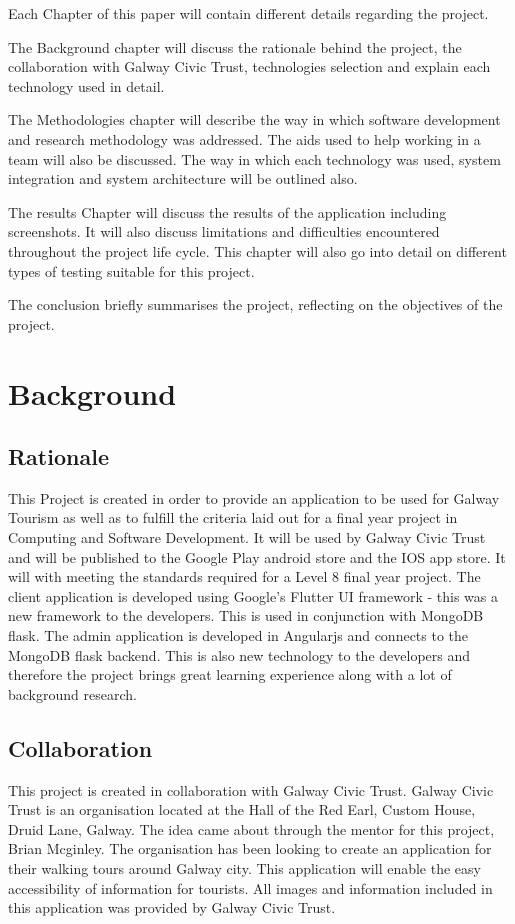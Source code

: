 Each Chapter of this paper will contain different details regarding the project. 

The Background chapter will discuss the rationale behind the project, the collaboration with Galway Civic Trust, technologies selection and explain each technology used in detail.

The Methodologies chapter will describe the way in which software development and research methodology was addressed. The aids used to help working in a team will also be discussed. The way in which each technology was used, system integration and system architecture will be outlined also.

The results Chapter will discuss the results of the application including screenshots. It will also discuss limitations and difficulties encountered throughout the project life cycle. This chapter will also go into detail on different types of testing suitable for this project.

The conclusion briefly summarises the project, reflecting on the objectives of the project.

\chapter{Background}
\section{Rationale}
This Project is created in order to provide an application to be used for Galway Tourism as well as to fulfill the criteria laid out for a final year project in Computing and Software Development. It will be used by Galway Civic Trust and will be published to the Google Play android store and the IOS app store. It will with meeting the standards required for a Level 8 final year project. The client application is developed using Google’s Flutter UI framework - this was a new framework to the developers. This is used in conjunction with MongoDB flask. The admin application is developed in Angularjs and connects to the MongoDB flask backend. This is also new technology to the developers and therefore the project brings great learning experience along with a lot of background research.

\section{Collaboration}
This project is created in collaboration with Galway Civic Trust. Galway Civic Trust is an organisation located at the Hall of the Red Earl, Custom House, Druid Lane, Galway. The idea came about through the mentor for this project, Brian Mcginley. The organisation has been looking to create an application for their walking tours around Galway city. This application will enable the easy accessibility of information for tourists. All images and information included in this application was provided by Galway Civic Trust.

